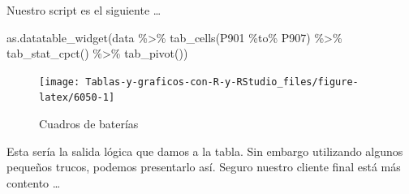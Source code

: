 \documentclass[
]{book}
\newenvironment{Shaded}{\begin{snugshade}}{\end{snugshade}}
\newcommand{\FunctionTok}[1]{\textcolor[rgb]{0.00,0.00,0.00}{#1}}
\newcommand{\NormalTok}[1]{#1}
\newcommand{\SpecialCharTok}[1]{\textcolor[rgb]{0.00,0.00,0.00}{#1}}
\begin{document}
Nuestro script es el siguiente \ldots{}

\begin{Shaded}
\begin{Highlighting}[]
\FunctionTok{as.datatable\_widget}\NormalTok{(data }\SpecialCharTok{\%\textgreater{}\%}
  \FunctionTok{tab\_cells}\NormalTok{(P901 }\SpecialCharTok{\%to\%}\NormalTok{ P907) }\SpecialCharTok{\%\textgreater{}\%}
  \FunctionTok{tab\_stat\_cpct}\NormalTok{() }\SpecialCharTok{\%\textgreater{}\%}
  \FunctionTok{tab\_pivot}\NormalTok{())}
\end{Highlighting}
\end{Shaded}

\begin{figure}[H]

{\centering \texttt{[image: Tablas-y-graficos-con-R-y-RStudio\_files/figure-latex/6050-1]} 

}

\caption{Cuadros de baterías}\label{fig:6050}
\end{figure}

Esta sería la salida lógica que damos a la tabla. Sin embargo utilizando algunos pequeños trucos, podemos presentarlo así. Seguro nuestro cliente final está más contento \ldots{}
\end{document}
